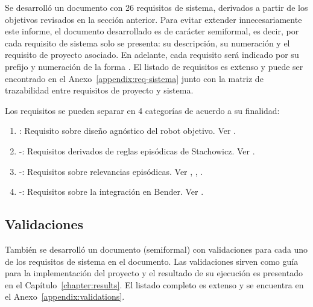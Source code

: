 Se desarrolló un documento con 26 requisitos de sistema, derivados a partir de los objetivos revisados en la sección anterior. Para evitar extender innecesariamente este informe, el documento desarrollado es de carácter semiformal, es decir, por cada requisito de sistema solo se presenta: su descripción, su numeración y el requisito de proyecto asociado. En adelante, cada requisito será indicado por su prefijo y numeración de la forma . El listado de requisitos es extenso y puede ser encontrado en el Anexo~\ref{appendix:req-sistema} junto con la matriz de trazabilidad entre requisitos de proyecto y sistema.

Los requisitos se pueden separar en 4 categorías de acuerdo a su finalidad:
\begin{enumerate}
\item {}: Requisito sobre diseño agnóstico del robot objetivo. Ver .
\item {}-: Requisitos derivados de reglas episódicas de Stachowicz. Ver .
\item {}-: Requisitos sobre relevancias episódicas. Ver , , .
\item {}-: Requisitos sobre la integración en Bender. Ver .
\end{enumerate}

\subsection{Validaciones}

También se desarrolló un documento (semiformal) con validaciones para cada uno de los requisitos de sistema en el documento. Las validaciones sirven como guía para la implementación del proyecto y el resultado de su ejecución es presentado en el Capítulo~\ref{chapter:results}. El listado completo es extenso y se encuentra en el Anexo~\ref{appendix:validations}.

